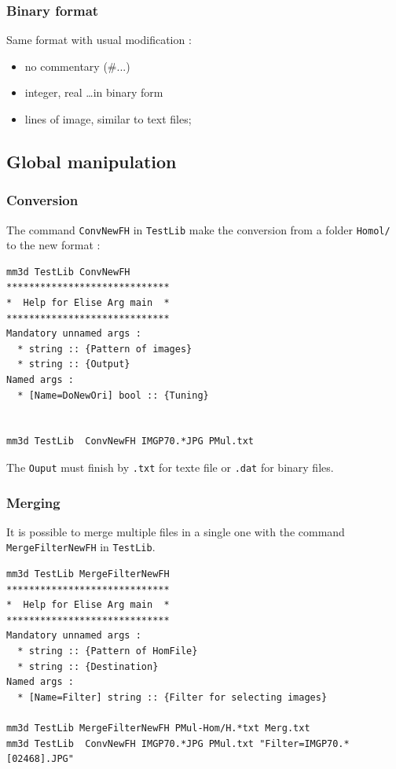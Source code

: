 \subsubsection{Binary format}

Same format with usual modification :

\begin{itemize}
    \item no commentary (\#...)
    \item integer, real \dots in binary form
    \item lines of image, similar to text files;

\end{itemize}


\subsection{Global manipulation}


\subsubsection{Conversion}

The command {\tt ConvNewFH} in {\tt TestLib} make the conversion from a folder
{\tt Homol/} to the new format :

\begin{verbatim}
mm3d TestLib ConvNewFH
*****************************
*  Help for Elise Arg main  *
*****************************
Mandatory unnamed args : 
  * string :: {Pattern of images}
  * string :: {Output}
Named args : 
  * [Name=DoNewOri] bool :: {Tuning}


mm3d TestLib  ConvNewFH IMGP70.*JPG PMul.txt
\end{verbatim}

The {\tt Ouput} must finish by {\tt .txt} for texte file or {\tt .dat}
for binary files.

\subsubsection{Merging}

It is possible to merge multiple files in a single  one with
the command {\tt MergeFilterNewFH} in {\tt TestLib}.

\begin{verbatim}
mm3d TestLib MergeFilterNewFH
*****************************
*  Help for Elise Arg main  *
*****************************
Mandatory unnamed args : 
  * string :: {Pattern of HomFile}
  * string :: {Destination}
Named args : 
  * [Name=Filter] string :: {Filter for selecting images}

mm3d TestLib MergeFilterNewFH PMul-Hom/H.*txt Merg.txt
mm3d TestLib  ConvNewFH IMGP70.*JPG PMul.txt "Filter=IMGP70.*[02468].JPG"
\end{verbatim}

